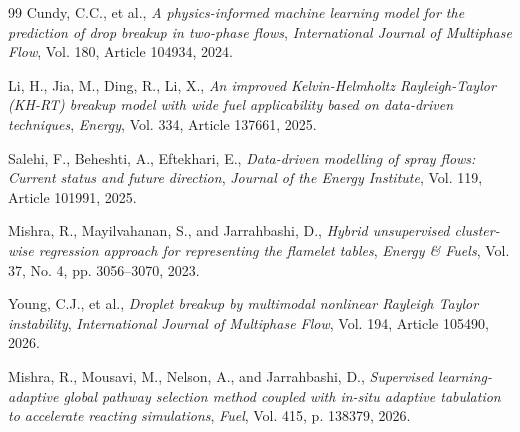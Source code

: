 \documentclass[letterpaper,twocolumn,10pt]{article}
\begin{document}
\begin{thebibliography}{99}
Cundy, C.C., et al., \textit{A physics-informed machine learning model for the
prediction of drop breakup in two-phase flows},
{\it International Journal of Multiphase Flow}, Vol. 180, Article 104934, 2024.

Li, H., Jia, M., Ding, R., Li, X., \textit{An improved Kelvin-Helmholtz
Rayleigh-Taylor (KH-RT) breakup model with wide fuel applicability based on
data-driven techniques}, {\it Energy}, Vol. 334, Article 137661, 2025.

Salehi, F., Beheshti, A., Eftekhari, E., \textit{Data-driven modelling of spray
flows: Current status and future direction},
{\it Journal of the Energy Institute}, Vol. 119, Article 101991, 2025.

Mishra, R., Mayilvahanan, S., and Jarrahbashi, D., \textit{Hybrid unsupervised cluster-wise regression approach for representing the flamelet tables}, {
\it Energy \& Fuels}, Vol. 37, No. 4, pp. 3056--3070, 2023.

Young, C.J., et al., \textit{Droplet breakup by multimodal nonlinear Rayleigh
Taylor instability}, {\it International Journal of Multiphase Flow},
Vol. 194, Article 105490, 2026.

Mishra, R., Mousavi, M., Nelson, A., and Jarrahbashi, D., \textit{Supervised learning-adaptive global pathway selection method coupled with in-situ adaptive tabulation to accelerate reacting simulations}, {\it Fuel}, Vol. 415, p. 138379, 2026.

\end{thebibliography}


\end{document}
